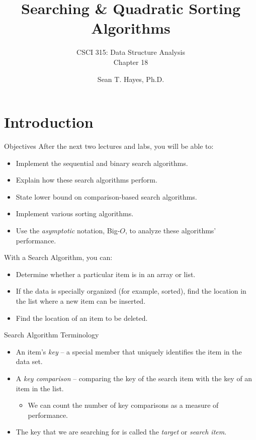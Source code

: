 \documentclass[14pt,aspectratio=1610]{beamer}
\title{\Huge{} Searching \& Quadratic Sorting Algorithms}
\subtitle{CSCI 315: Data Structure Analysis\\Chapter 18}
\author{Sean T. Hayes, Ph.D.}
\institute{Charleston Southern University}
\begin{document}
\begin{frame}
  \titlepage{}
\end{frame}
\section{Introduction}

\begin{frame}{Objectives}
After the next two lectures and labs, you will be able to:
\begin{itemize}
  \item
    Implement the sequential and binary search algorithms.
  \item
    Explain how these search algorithms perform.
  \item
    State lower bound on comparison-based search algorithms.
  \item
    Implement various sorting algorithms.
  \item
    Use the \textit{asymptotic} notation, Big-$O$, to analyze these algorithms' performance.
\end{itemize}
\end{frame}

\begin{frame}{With a Search Algorithm, you can:}
\begin{itemize}
  \item
    Determine whether a particular item is in an array or list.
  \item
    If the data is specially organized (for example, sorted), find the location in the list where a new item can be inserted.
  \item
    Find the location of an item to be deleted.
\end{itemize}
\end{frame}

\begin{frame}{Search Algorithm Terminology}
\begin{itemize}
  \item
    An item's \emph{key} -- a special member that uniquely identifies the item in the data set.

  \item
    A \emph{key comparison} -- comparing the key of the search item with the key of an item in the list.
    \begin{itemize}
      \item
        We can count the number of key comparisons as a measure of performance.
    \end{itemize}
  \item
    The key that we are searching for is called the \emph{target} or \emph{search item}.
\end{itemize}
\end{frame}
\end{document}
